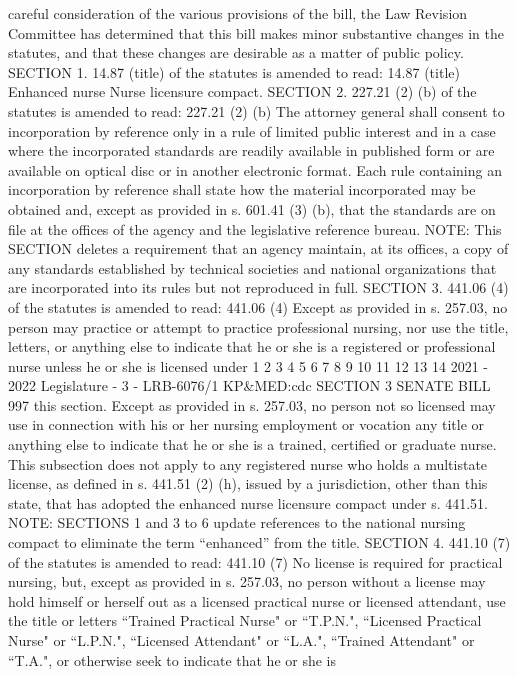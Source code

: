 careful consideration of the various provisions of the bill, the Law Revision Committee
has determined that this bill makes minor substantive changes in the statutes, and that
these changes are desirable as a matter of public policy.
SECTION 1. 14.87 (title) of the statutes is amended to read:
14.87 (title) Enhanced nurse Nurse licensure compact.
SECTION 2. 227.21 (2) (b) of the statutes is amended to read:
227.21 (2) (b) The attorney general shall consent to incorporation by reference
only in a rule of limited public interest and in a case where the incorporated
standards are readily available in published form or are available on optical disc or
in another electronic format. Each rule containing an incorporation by reference
shall state how the material incorporated may be obtained and, except as provided
in s. 601.41 (3) (b), that the standards are on file at the offices of the agency and the
legislative reference bureau.
NOTE: This SECTION deletes a requirement that an agency maintain, at its offices,
a copy of any standards established by technical societies and national organizations that
are incorporated into its rules but not reproduced in full.
SECTION 3. 441.06 (4) of the statutes is amended to read:
441.06 (4) Except as provided in s. 257.03, no person may practice or attempt
to practice professional nursing, nor use the title, letters, or anything else to indicate
that he or she is a registered or professional nurse unless he or she is licensed under
1
2
3
4
5
6
7
8
9
10
11
12
13
14
2021 - 2022 Legislature - 3 - LRB-6076/1
KP&MED:cdc
SECTION 3 SENATE BILL 997
this section. Except as provided in s. 257.03, no person not so licensed may use in
connection with his or her nursing employment or vocation any title or anything else
to indicate that he or she is a trained, certified or graduate nurse. This subsection
does not apply to any registered nurse who holds a multistate license, as defined in
s. 441.51 (2) (h), issued by a jurisdiction, other than this state, that has adopted the
enhanced nurse licensure compact under s. 441.51.
NOTE: SECTIONS 1 and 3 to 6 update references to the national nursing compact to
eliminate the term “enhanced” from the title.
SECTION 4. 441.10 (7) of the statutes is amended to read:
441.10 (7) No license is required for practical nursing, but, except as provided
in s. 257.03, no person without a license may hold himself or herself out as a licensed
practical nurse or licensed attendant, use the title or letters “Trained Practical
Nurse" or “T.P.N.", “Licensed Practical Nurse" or “L.P.N.", “Licensed Attendant" or
“L.A.", “Trained Attendant" or “T.A.", or otherwise seek to indicate that he or she is
